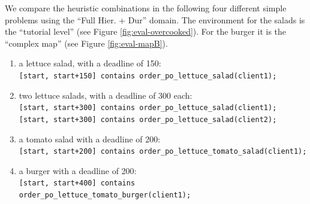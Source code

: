 We compare the heuristic combinations in the following four different simple problems using the ``Full Hier. + Dur'' domain.
The environment for the salads is the ``tutorial level'' (see Figure \ref{fig:eval-overcooked}).
For the burger it is the ``complex map'' (see Figure \ref{fig:eval-mapB}).
\begin{enumerate}
  \item a lettuce salad, with a deadline of 150:\\ 
    \verb|[start, start+150] contains order_po_lettuce_salad(client1);|
  \item two lettuce salads, with a deadline of 300 each:\\
    \verb|[start, start+300] contains order_po_lettuce_salad(client1);|\\
    \verb|[start, start+300] contains order_po_lettuce_salad(client2);|\\
  \item a tomato salad with a deadline of 200:\\
    \verb|[start, start+200] contains order_po_lettuce_tomato_salad(client1);|
  \item a burger with a deadline of 200:\\
    \verb|[start, start+400] contains order_po_lettuce_tomato_burger(client1);|
\end{enumerate}

